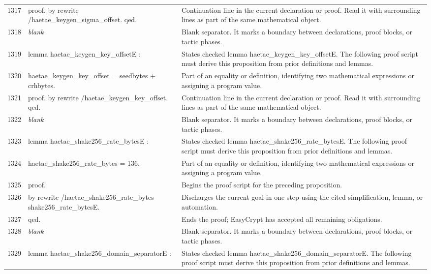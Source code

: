 \documentclass[10pt]{article}
\begin{document}
\begin{longtable}{r L{0.53\textwidth} L{0.37\textwidth}}
1317 & {\ttfamily\scriptsize proof. by rewrite /haetae\_keygen\_sigma\_offset. qed.} & Continuation line in the current declaration or proof.  Read it with surrounding lines as part of the same mathematical object. \\
1318 & {\ttfamily\scriptsize \emph{blank}} & Blank separator.  It marks a boundary between declarations, proof blocks, or tactic phases. \\
1319 & {\ttfamily\scriptsize lemma haetae\_keygen\_key\_offsetE :} & States checked lemma haetae\_keygen\_key\_offsetE.  The following proof script must derive this proposition from prior definitions and lemmas. \\
1320 & {\ttfamily\scriptsize   haetae\_keygen\_key\_offset = seedbytes + crhbytes.} & Part of an equality or definition, identifying two mathematical expressions or assigning a program value. \\
1321 & {\ttfamily\scriptsize proof. by rewrite /haetae\_keygen\_key\_offset. qed.} & Continuation line in the current declaration or proof.  Read it with surrounding lines as part of the same mathematical object. \\
1322 & {\ttfamily\scriptsize \emph{blank}} & Blank separator.  It marks a boundary between declarations, proof blocks, or tactic phases. \\
1323 & {\ttfamily\scriptsize lemma haetae\_shake256\_rate\_bytesE :} & States checked lemma haetae\_shake256\_rate\_bytesE.  The following proof script must derive this proposition from prior definitions and lemmas. \\
1324 & {\ttfamily\scriptsize   haetae\_shake256\_rate\_bytes = 136.} & Part of an equality or definition, identifying two mathematical expressions or assigning a program value. \\
1325 & {\ttfamily\scriptsize proof.} & Begins the proof script for the preceding proposition. \\
1326 & {\ttfamily\scriptsize by rewrite /haetae\_shake256\_rate\_bytes shake256\_rate\_bytesE.} & Discharges the current goal in one step using the cited simplification, lemma, or automation. \\
1327 & {\ttfamily\scriptsize qed.} & Ends the proof; EasyCrypt has accepted all remaining obligations. \\
1328 & {\ttfamily\scriptsize \emph{blank}} & Blank separator.  It marks a boundary between declarations, proof blocks, or tactic phases. \\
1329 & {\ttfamily\scriptsize lemma haetae\_shake256\_domain\_separatorE :} & States checked lemma haetae\_shake256\_domain\_separatorE.  The following proof script must derive this proposition from prior definitions and lemmas. \\

\end{longtable}
\end{document}
